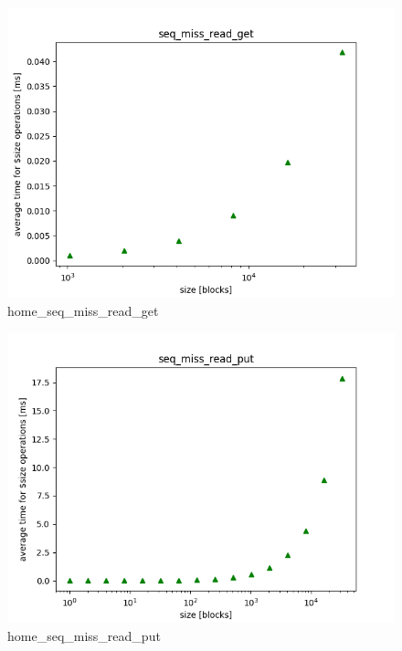 \documentclass[twocolumn,11pt]{article}
\begin{document}
\begin{figure}[h!]
  \includegraphics[width=\linewidth]{Pictures/HOMEPC/seq_miss_read_complete_get.png}
  \caption{home\_seq\_miss\_read\_get}
  \label{fig:home_seq_miss_read_get}
\end{figure}
\begin{figure}[h!]
  \includegraphics[width=\linewidth]{Pictures/HOMEPC/seq_miss_read_complete_put.png}
  \caption{home\_seq\_miss\_read\_put}
  \label{fig:home_seq_miss_read_put}
\end{figure}
\end{document}

